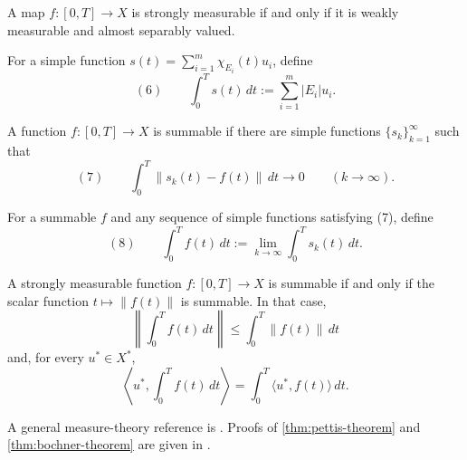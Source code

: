 \begin{theorem}[Pettis]
\label{thm:pettis-theorem}
A map $f:[0,T]\to X$ is strongly measurable if and only if it is weakly
measurable and almost separably valued.
\end{theorem}

\begin{definition}
\label{def:integral-of-simple-function}
For a simple function $s(t)=\sum_{i=1}^m\chi_{E_i}(t)u_i$, define
\[
(6)\qquad
\int_0^T s(t)\,dt:=\sum_{i=1}^m|E_i|u_i.
\]
\end{definition}

\begin{definition}
\label{def:summable-banach-valued-function}
A function $f:[0,T]\to X$ is summable if there are simple functions
$\{s_k\}_{k=1}^\infty$ such that
\[
(7)\qquad
\int_0^T\|s_k(t)-f(t)\|\,dt\to0
\qquad(k\to\infty).
\]
\end{definition}

\begin{definition}
\label{def:bochner-integral}
For a summable $f$ and any sequence of simple functions satisfying (7), define
\[
(8)\qquad
\int_0^T f(t)\,dt:=\lim_{k\to\infty}\int_0^T s_k(t)\,dt.
\]
\end{definition}

\begin{theorem}[Bochner]
\label{thm:bochner-theorem}
A strongly measurable function $f:[0,T]\to X$ is summable if and only if the
scalar function $t\mapsto\|f(t)\|$ is summable. In that case,
\[
\left\|\int_0^T f(t)\,dt\right\|
\leq\int_0^T\|f(t)\|\,dt
\]
and, for every $u^*\in X^*$,
\[
\left\langle u^*,\int_0^T f(t)\,dt\right\rangle
=\int_0^T\langle u^*,f(t)\rangle\,dt.
\]
\end{theorem}

A general measure-theory reference is \cite{Folland1984}. Proofs of
\cref{thm:pettis-theorem} and \cref{thm:bochner-theorem} are given in
\cite[Chapter V, Sections 4--5]{Yosida1980}.
